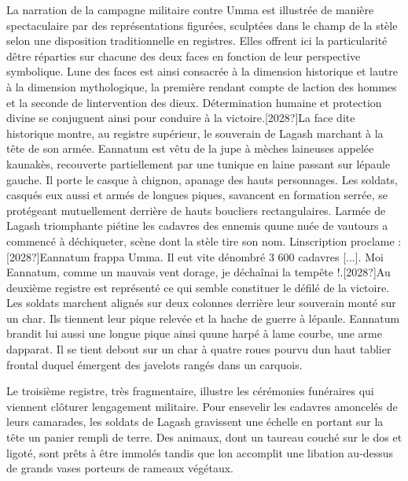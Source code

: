 \documentclass{article}
\begin{document}
La narration de la campagne militaire contre Umma est illustrée de
manière spectaculaire par des représentations figurées, sculptées dans
le champ de la stèle selon une disposition traditionnelle en registres.
Elles offrent ici la particularité d{\textquotesingle}être réparties
sur chacune des deux faces en fonction de leur perspective symbolique.
L{\textquotesingle}une des faces est ainsi consacrée à la dimension
{\textquotedbl}historique{\textquotedbl} et l{\textquotesingle}autre à
la dimension {\textquotedbl}mythologique{\textquotedbl}, la première
rendant compte de l{\textquotesingle}action des hommes et la seconde de
l{\textquotesingle}intervention des dieux. Détermination humaine et
protection divine se conjuguent ainsi pour conduire à la
victoire.[2028?]La face dite {\textquotedbl}historique{\textquotedbl}
montre, au registre supérieur, le souverain de Lagash marchant à la
tête de son armée. Eannatum est vêtu de la jupe à mèches laineuses
appelée kaunakès, recouverte partiellement par une tunique en laine
passant sur l{\textquotesingle}épaule gauche. Il porte le casque à
chignon, apanage des hauts personnages. Les soldats, casqués eux aussi
et armés de longues piques, s{\textquotesingle}avancent en formation
serrée, se protégeant mutuellement derrière de hauts boucliers
rectangulaires. L{\textquotesingle}armée de Lagash triomphante piétine
les cadavres des ennemis qu{\textquotesingle}une nuée de vautours a
commencé à déchiqueter, scène dont la stèle tire son nom.
L{\textquotesingle}inscription proclame :[2028?]{\textquotedbl}Eannatum
frappa Umma. Il eut vite dénombré 3 600 cadavres [...]. Moi Eannatum,
comme un mauvais vent d{\textquotesingle}orage, je déchaînai la tempête
!{\textquotedbl}.[2028?]Au deuxième registre est représenté ce qui
semble constituer le défilé de la victoire. Les soldats marchent
alignés sur deux colonnes derrière leur souverain monté sur un char.
Ils tiennent leur pique relevée et la hache de guerre à
l{\textquotesingle}épaule. Eannatum brandit lui aussi une longue pique
ainsi qu{\textquotesingle}une harpé à lame courbe, une arme
d{\textquotesingle}apparat. Il se tient debout sur un char à quatre
roues pourvu d{\textquotesingle}un haut tablier frontal duquel émergent
des javelots rangés dans un carquois.

Le troisième registre, très fragmentaire, illustre les cérémonies
funéraires qui viennent clôturer l{\textquotesingle}engagement
militaire. Pour ensevelir les cadavres amoncelés de leurs camarades,
les soldats de Lagash gravissent une échelle en portant sur la tête un
panier rempli de terre. Des animaux, dont un taureau couché sur le dos
et ligoté, sont prêts à être immolés tandis que l{\textquotesingle}on
accomplit une libation au-dessus de grands vases porteurs de rameaux
végétaux.
\end{document}

